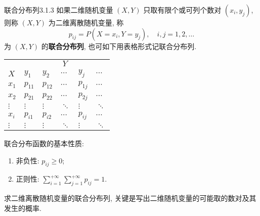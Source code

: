    \begin{definition}{联合分布列}{3.1.3}
		如果二维随机变量 $(X,Y)$ 只取有限个或可列个数对 $(x_i,y_j)$, 则称 $(X,Y)$ 为二维离散随机变量, 称
    \begin{equation}\label{eq:3.1.2}
     	p_{i j}=P\left(X=x_{i}, Y=y_{j}\right), \quad i, j=1,2, \ldots
    \end{equation}
   	为 $(X,Y)$ 的\textbf{联合分布列}, 也可如下用表格形式记联合分布列.
   \end{definition}
   \begin{center}
   		\begin{tabularx}{0.8\textwidth}{ZZZZZZ}
   		\toprule
   		 &  \\
   		 $X$	&	$y_1$&	$y_2$&	$\cdots$&	$y_j$& $\cdots	$ \\
   		 \midrule
   		 $x_1$& $p_{11}$ & $p_{12}$ & $\cdots$ & $p_{1j}$ & $\cdots$ \\
   		 \midrule
   		 $x_2$& $p_{21}$ & $p_{22}$ & $\cdots$ & $p_{2j}$ & $\cdots$\\
   		 \midrule
   		 $\vdots$& $\vdots$ & $\vdots$ & $\ddots$ & $\vdots$ & $\ddots$ \\
   		 \midrule
   		$x_i$ & $p_{i1}$ & $p_{i2}$ & $\cdots$ & $p_{ij}$  & $\cdots$ \\
   		\midrule
   		 $\vdots$& $\vdots$ & $\vdots$ & $\ddots$ & $\vdots$ & $\ddots$ \\
   		 \bottomrule
   		\end{tabularx}
   \end{center}
   联合分布函数的基本性质:
   \begin{enumerate}
   	\item 非负性: $p_{ij}\geq 0$;
   	\item 正则性: $\sum_{i=1}^{+\infty}\sum_{j=1}^{+\infty}p_{ij}=1$.
   \end{enumerate}
   求二维离散随机变量的联合分布列, 关键是写出二维随机变量的可能取的数对及其发生的概率.

